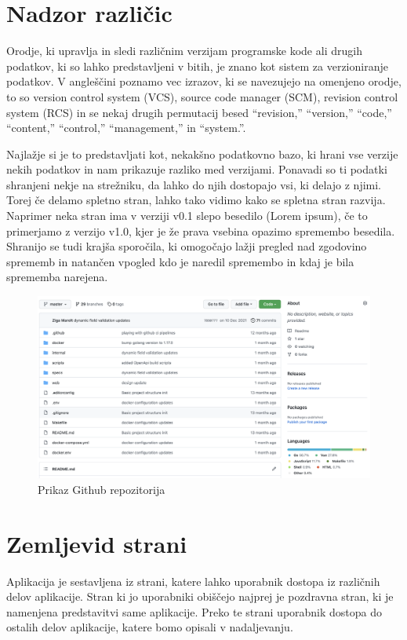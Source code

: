 \documentclass[a4paper, 12pt]{book}
\begin{document}
\section{Nadzor različic}

Orodje, ki upravlja in sledi različnim verzijam programske kode ali drugih podatkov, ki so lahko predstavljeni v bitih, je znano kot sistem za verzioniranje podatkov. V angleščini poznamo vec izrazov, ki se navezujejo na omenjeno orodje, to so version control system (VCS), source code manager (SCM), revision control system (RCS) in se nekaj drugih permutacij besed “revision,” “version,” “code,” “content,” “control,” “management,” in “system.”.

Najlažje si je to predstavljati kot, nekakšno podatkovno bazo, ki hrani vse verzije nekih podatkov in nam prikazuje razliko med verzijami. Ponavadi so ti podatki shranjeni nekje na strežniku, da lahko do njih dostopajo vsi, ki delajo z njimi. Torej če delamo spletno stran, lahko tako vidimo kako se spletna stran razvija. Naprimer neka stran ima v verziji v0.1 slepo besedilo (Lorem ipsum), če to primerjamo z verzijo v1.0, kjer je že prava vsebina opazimo spremembo besedila. Shranijo se tudi krajša sporočila, ki omogočajo lažji pregled nad zgodovino sprememb in natančen vpogled kdo je naredil spremembo in kdaj je bila sprememba narejena.

\begin{figure}[h]
\begin{center}
\includegraphics[width=1\textwidth]{slike/github.png}
\end{center}
\caption{ Prikaz Github repozitorija }
\label{github}
\end{figure}

\section{Zemljevid strani}
Aplikacija je sestavljena iz strani, katere lahko uporabnik dostopa iz različnih delov aplikacije. Stran ki jo uporabniki obiščejo najprej je pozdravna stran, ki je namenjena predstavitvi same aplikacije. Preko te strani uporabnik dostopa do ostalih delov aplikacije, katere bomo opisali v nadaljevanju.
\end{document}
